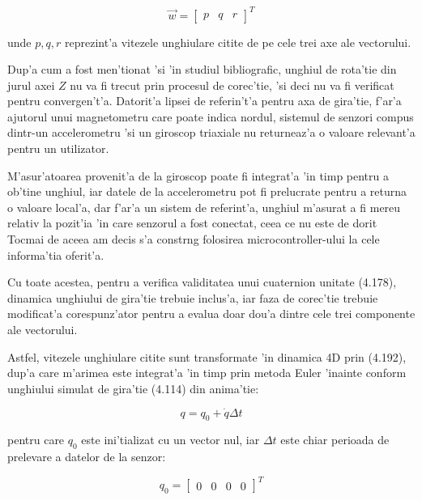 \documentclass[12pt,a4paper,twoside]{report}
\begin{document}
\begin{equation}
    \vec w = \begin{bmatrix}
    p & q & r
    \end{bmatrix}^T
\end{equation}

unde $p, q, r$ reprezint'a vitezele unghiulare citite de pe cele trei axe ale vectorului. 

\vspace{5px}

Dup'a cum a fost men'tionat 'si 'in studiul bibliografic, unghiul de rota'tie din jurul axei $Z$ nu va fi trecut prin procesul de corec'tie, 'si deci nu va fi verificat pentru convergen't'a.  Datorit'a lipsei de referin't'a pentru axa de gira'tie, f'ar'a ajutorul unui magnetometru care poate indica nordul, sistemul de senzori compus dintr-un accelerometru 'si un giroscop triaxiale nu returneaz'a o valoare relevant'a pentru un utilizator.

\vspace{5px}

M'asur'atoarea provenit'a de la giroscop poate fi integrat'a 'in timp pentru a ob'tine unghiul, iar datele de la accelerometru pot fi prelucrate pentru a returna o valoare local'a, dar f'ar'a un sistem de referint'a, unghiul m'asurat a fi mereu relativ la pozit'ia 'in care senzorul a fost conectat, ceea ce nu este de dorit Tocmai de aceea am decis s'a constr\ia ng folosirea microcontroller-ului la cele informa'tia oferit'a.

\vspace{5px}

Cu toate acestea, pentru a verifica validitatea unui cuaternion unitate (4.178), dinamica unghiului de gira'tie trebuie inclus'a, iar faza de corec'tie trebuie modificat'a corespunz'ator pentru a evalua doar dou'a dintre cele trei componente ale vectorului.

Astfel, vitezele unghiulare citite sunt transformate 'in dinamica 4D prin (4.192), dup'a care m'arimea este integrat'a 'in timp prin metoda Euler 'inainte conform unghiului simulat de gira'tie (4.114) din anima'tie:

\begin{equation}
    q = q_0 + \dot q \Delta t
\end{equation}

pentru care $q_0$ este ini'tializat cu un vector nul, iar $\Delta t$ este chiar perioada de prelevare a datelor de la senzor:

\begin{equation}
    q_0 = \begin{bmatrix}
    0 & 0 & 0 & 0 
    \end{bmatrix}^T
\end{equation}
\end{document}
